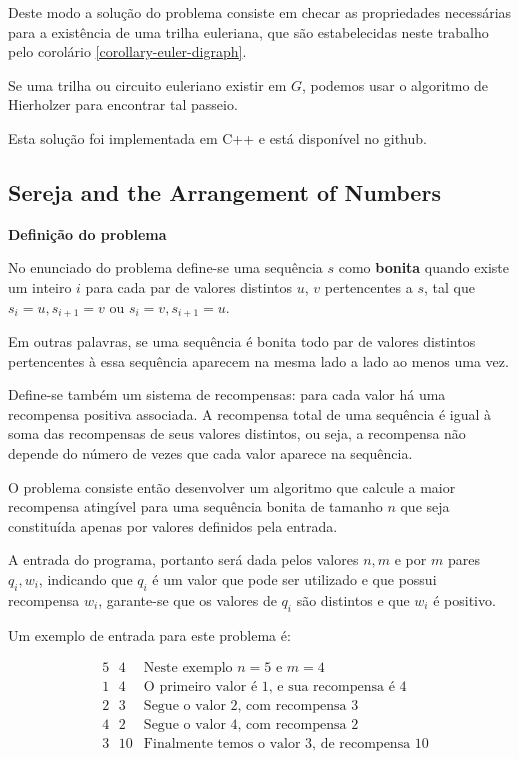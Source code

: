 \documentclass[12pt, a4paper]{article}
\begin{document}
        Deste modo a solução do problema consiste em checar as propriedades necessárias para a existência de uma trilha euleriana, que são estabelecidas neste trabalho pelo corolário \ref{corollary-euler-digraph}.

        Se uma trilha ou circuito euleriano existir em $G$, podemos usar o algoritmo de Hierholzer para encontrar tal passeio.

        Esta solução foi implementada em C++ e está disponível no github\cite{tanya-sol}.

        \subsection{Sereja and the Arrangement of Numbers}

        \textbf{Definição do problema}

        No enunciado do problema\cite{sereja} define-se uma sequência $s$ como \textbf{bonita} quando existe um inteiro $i$ para cada par de valores distintos $u$, $v$ pertencentes a $s$, tal que $s_i = u, s_{i+1} = v$ ou $s_i = v, s_{i+1} = u$.

        Em outras palavras, se uma sequência é bonita todo par de valores distintos pertencentes à essa sequência aparecem na mesma lado a lado ao menos uma vez.

        Define-se também um sistema de recompensas:
        para cada valor há uma recompensa positiva associada.
        A recompensa total de uma sequência é igual à soma das recompensas de seus valores distintos, ou seja, a recompensa não depende do número de vezes que cada valor aparece na sequência.

        O problema consiste então desenvolver um algoritmo que calcule a maior recompensa atingível para uma sequência bonita de tamanho $n$ que seja constituída apenas por valores definidos pela entrada. 

        A entrada do programa, portanto será dada pelos valores $n, m$ e por $m$ pares $q_i, w_i$, indicando que $q_i$ é um valor que pode ser utilizado e que possui recompensa $w_i$, garante-se que os valores de $q_i$ são distintos e que $w_i$ é positivo.

        Um exemplo de entrada para este problema é:

        \begin{align*}
            & 5 \text{ }4 & \text{Neste exemplo $n = 5$ e $m = 4$}\\
            & 1 \text{ }4 & \text{O primeiro valor é 1, e sua recompensa é 4}\\
            & 2 \text{ }3 & \text{Segue o valor 2, com recompensa 3}\\
            & 4 \text{ }2 & \text{Segue o valor 4, com recompensa 2}\\
            & 3 \text{ }10 &\text{Finalmente temos o valor 3, de recompensa 10}\\
        \end{align*}
\end{document}
